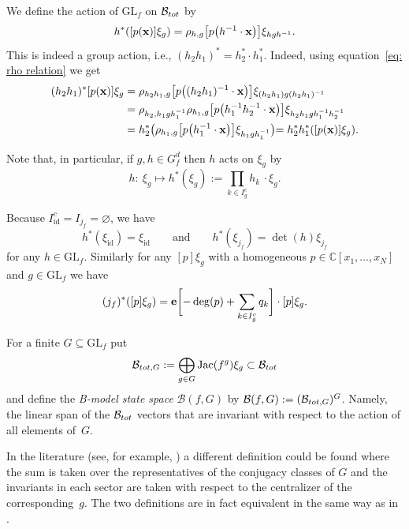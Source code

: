 \documentclass[10pt,a4paper]{article}
\numberwithin{equation}{section}
\newcommand{\CC}{{\mathbb{C}}}
\newcommand{\GL}{{\mathrm{GL}}}
\newcommand{\epi}{{\bf e}}
\newcommand{\Jac}{\mathrm{Jac}}
\newcommand{\id}{\mathrm{id}}
\newcommand{\bx}{{\bf x}}
\def\B{{\mathcal B}}
\begin{document}
We define the action of $\GL_f$ on $\B_{\rm tot}$ by
\begin{align*}
h^*([p(\bx)]\xi_{g})=\rho_{h,g}\bigl[p\bigl(h^{-1}\cdot\bx\bigl)\bigr]\xi_{hgh^{-1}}.
\end{align*}
This is indeed a group action, i.e., $(h_2h_1)^* = h_2^* \cdot h_1^*$. Indeed, using equation~\eqref{eq: rho relation} we get
\begin{align*}
(h_2h_1)^*[p(\bx)]\xi_{g} &=\rho_{h_2h_1,g}\bigl[p\bigl((h_2h_1)^{-1}\cdot\bx\bigr)\bigr]\xi_{(h_2h_1)g(h_2h_1)^{-1}}
\\ &=\rho_{h_2,h_1gh_1^{-1}}\rho_{h_1,g}\bigl[p\bigl(h_1^{-1}h_2^{-1}\cdot\bx\bigr)\bigr]\xi_{h_2h_1gh_1^{-1}h_2^{-1}}
\\ &=h_2^*\bigl(\rho_{h_1,g}\bigl[p\bigl(h_1^{-1}\cdot\bx\bigl)\bigl]\xi_{h_1gh_1^{-1}}\bigl)=h_2^*h_1^*([p(\bx)]\xi_{g}).
\end{align*}

Note that, in particular, if $g,h\in G_f^d$ then $h$ acts on $\xi_g$ by
\begin{equation*}%
	h\colon\ \xi_g\mapsto h^{*} (\xi_g) := \prod_{k\in I_g^c} h_k\,\cdot \xi_g.
\end{equation*}

\begin{Example}\label{ex: J--action and bigrading}
Because $I_\id^c = I_{j_f} = \varnothing$, we have
\[
 h^*(\xi_\id) = \xi_\id \qquad \text{and} \qquad h^*(\xi_{j_f}) = \det(h) \xi_{j_f}
\]
for any $h \in \GL_f$.
Similarly for any $[p]\xi_g$ with a homogeneous $p \in \CC[x_1,\dots,x_N]$ and $g\in \GL_f$ we have
\[
(j_f)^*([p]\xi_g) = \epi\biggl[-\deg(p) + \sum_{k \in I_g^c} q_k\biggr] \cdot [p]\xi_g.
\]
\end{Example}

For a finite $G \subseteq \GL_f$ put
\[\B_{{\rm tot},G}:=\bigoplus_{g \in G} \Jac(f^g) \xi_g\subset \B_{\rm tot}\]
and define the \textit{B-model state space} $\B(f,G)$ by
$\B(f,G) := ( \B_{{\rm tot},G} )^G$. Namely, the linear span of the $\B_{\rm tot}$ vectors that are invariant with respect to the action of all elements of~$G$.

\begin{Remark}
 In the literature (see, for example, \cite{Muk}) a different definition could be found where the sum is taken over the representatives of the conjugacy classes of $G$ and the invariants in each sector are taken with respect to the centralizer of the corresponding~$g$. The two definitions are in fact equivalent in the same way as in \cite[Proposition~42]{BI22}.
\end{Remark}
\end{document}
